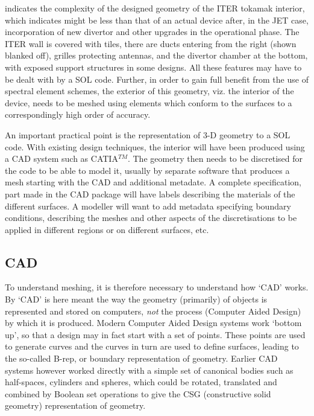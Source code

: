  indicates the complexity of the designed geometry of the
ITER tokamak interior, which  indicates might be less than that of an actual device
after, in the JET case, incorporation of new divertor and other upgrades in the operational phase.
The ITER wall is covered with tiles, there are ducts entering from the right (shown
blanked off), grilles protecting antennas, and the divertor chamber at the bottom, with
exposed support structures in some designs. All these features may have to be 
dealt with by a SOL code. Further, in order to gain full benefit from the use of
spectral element schemes, the exterior of this geometry, viz. the interior of the device,
needs to be meshed using elements which conform to the surfaces to a correspondingly
high order of accuracy.

An important practical point is the representation of 3-D geometry to a SOL code.
With existing design techniques, the interior will have been produced using a CAD system
such as CATIA$^{TM}$. 
The geometry then needs to be discretised for the code to be able to model it,
usually by separate software that produces a mesh starting with the CAD and additional
metadate. A complete specification, part made in the CAD package
will have labels describing the materials of the different surfaces. A modeller will
want to add metadata specifying boundary conditions,
describing the meshes and other aspects of the discretisations to be applied
in different regions or on different surfaces, etc.


\subsection{CAD}\label{sec:cadbackg}
To understand meshing, it is therefore necessary to understand how `CAD' works. By `CAD' is
here meant the way the geometry  (primarily) of objects is represented and
stored on computers, \emph{not} the process (Computer Aided Design) by which it is
produced.  Modern Computer Aided Design systems work `bottom up', so that a design may in fact
start with a set of points. These points are used to generate curves and the
curves in turn are used to define surfaces, leading to the so-called B-rep,
or boundary representation of geometry. Earlier CAD systems however worked
directly with a simple set of canonical bodies such as half-spaces, cylinders
and spheres, which could be rotated, translated and combined by Boolean
set operations to give the CSG (constructive solid geometry) representation
of geometry. 

